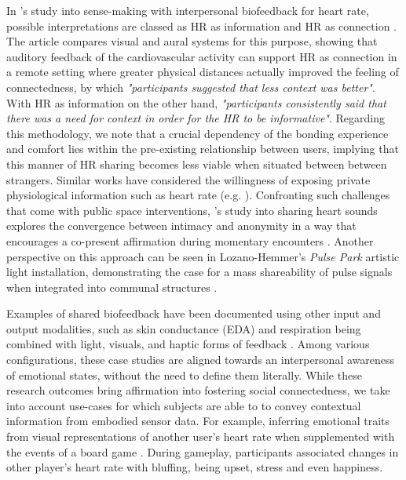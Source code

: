 In \citeauthor{slovak_understanding_2012}'s study into sense-making with interpersonal biofeedback for heart rate, possible interpretations are classed as HR as information and HR as connection \cite{slovak_understanding_2012}. The article compares visual and aural systems for this purpose, showing that auditory feedback of the cardiovascular activity can support HR as connection in a remote setting where greater physical distances actually improved the feeling of connectedness, by which \textit{"participants suggested that less context was better"}. With HR as information on the other hand, \textit{"participants consistently said that there was a need for context in order for the HR to be informative"}. Regarding this methodology, we note that a crucial dependency of the bonding experience and comfort lies within the pre-existing relationship between users, implying that this manner of HR sharing becomes less viable when situated between between strangers. Similar works have considered the willingness of exposing private physiological information such as heart rate (e.g. \cite{walmink_displaying_2013}). Confronting such challenges that come with public space interventions, \citeauthor{howell_life-affirming_2019}'s study into sharing heart sounds explores the convergence between intimacy and anonymity in a way that encourages a co-present affirmation during momentary encounters \cite{howell_life-affirming_2019}. Another perspective on this approach can be seen in Lozano-Hemmer’s \textit{Pulse Park} artistic light installation, demonstrating the case for a mass shareability of pulse signals when integrated into communal structures \cite{lozano-hemmer_2007}.

Examples of shared biofeedback have been documented using other input and output modalities, such as skin conductance (EDA) and respiration being combined with light, visuals, and haptic forms of feedback \cite{frey_breeze_2018,howell_biosignals_2016,ashford_eeg_2019}. Among various configurations, these case studies are aligned towards an interpersonal awareness of emotional states, without the need to define them literally. While these research outcomes bring affirmation into fostering social connectedness, we take into account use-cases for which subjects are able to to convey contextual information from embodied sensor data. For example, inferring emotional traits from visual representations of another user's heart rate when supplemented with the events of a board game \cite{frey_remote_2016}. During gameplay, participants associated changes in other player's heart rate with bluffing, being upset, stress and even happiness.


